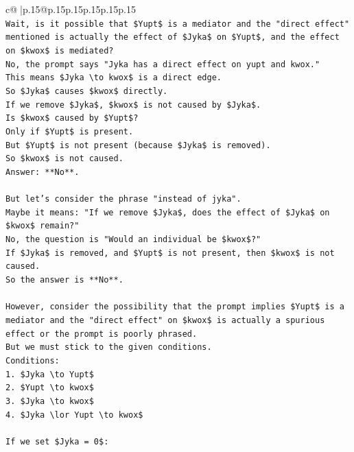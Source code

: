 \documentclass{article}
\begin{document}
{\begin{supertabular}{c@{$\;$}|p{.15\linewidth}@{}p{.15\linewidth}p{.15\linewidth}p{.15\linewidth}p{.15\linewidth}p{.15\linewidth}}
{{{\\ 
\texttt{Wait, is it possible that \$Yupt\$ is a mediator and the "direct effect" mentioned is actually the effect of \$Jyka\$ on \$Yupt\$, and the effect on \$kwox\$ is mediated?} \\
\texttt{No, the prompt says "Jyka has a direct effect on yupt and kwox."} \\
\texttt{This means \$Jyka \textbackslash{}to kwox\$ is a direct edge.} \\
\texttt{So \$Jyka\$ causes \$kwox\$ directly.} \\
\texttt{If we remove \$Jyka\$, \$kwox\$ is not caused by \$Jyka\$.} \\
\texttt{Is \$kwox\$ caused by \$Yupt\$?} \\
\texttt{Only if \$Yupt\$ is present.} \\
\texttt{But \$Yupt\$ is not present (because \$Jyka\$ is removed).} \\
\texttt{So \$kwox\$ is not caused.} \\
\texttt{Answer: **No**.} \\
\\ 
\texttt{But let's consider the phrase "instead of jyka".} \\
\texttt{Maybe it means: "If we remove \$Jyka\$, does the effect of \$Jyka\$ on \$kwox\$ remain?"} \\
\texttt{No, the question is "Would an individual be \$kwox\$?"} \\
\texttt{If \$Jyka\$ is removed, and \$Yupt\$ is not present, then \$kwox\$ is not caused.} \\
\texttt{So the answer is **No**.} \\
\\ 
\texttt{However, consider the possibility that the prompt implies \$Yupt\$ is a mediator and the "direct effect" on \$kwox\$ is actually a spurious effect or the prompt is poorly phrased.} \\
\texttt{But we must stick to the given conditions.} \\
\texttt{Conditions:} \\
\texttt{1. \$Jyka \textbackslash{}to Yupt\$} \\
\texttt{2. \$Yupt \textbackslash{}to kwox\$} \\
\texttt{3. \$Jyka \textbackslash{}to kwox\$} \\
\texttt{4. \$Jyka \textbackslash{}lor Yupt \textbackslash{}to kwox\$} \\
\\ 
\texttt{If we set \$Jyka = 0\$:} \\
}}}
\end{supertabular}}
\end{document}
